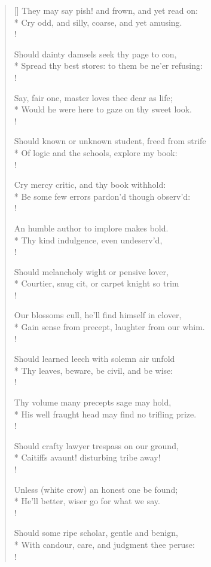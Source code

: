\begin{verse}[\versewidth]
They may say pish! and frown, and yet read on:\\*
Cry odd, and silly, coarse, and yet amusing.\\!

Should dainty damsels seek thy page to con,\\*
Spread thy best stores: to them be ne'er refusing:\\!

Say, fair one, master loves thee dear as life;\\*
Would he were here to gaze on thy sweet look.\\!

Should known or unknown student, freed from strife\\*
Of logic and the schools, explore my book:\\!

Cry mercy critic, and thy book withhold:\\*
Be some few errors pardon'd though observ'd:\\!

An humble author to implore makes bold.\\*
Thy kind indulgence, even undeserv'd,\\!

Should melancholy wight or pensive lover,\\*
Courtier, snug cit, or carpet knight so trim\\!

Our blossoms cull, he'll find himself in clover,\\*
Gain sense from precept, laughter from our whim.\\!

Should learned leech with solemn air unfold\\*
Thy leaves, beware, be civil, and be wise:\\!

Thy volume many precepts sage may hold,\\*
His well fraught head may find no trifling prize.\\!

Should crafty lawyer trespass on our ground,\\*
Caitiffs avaunt! disturbing tribe away!\\!

Unless (white crow) an honest one be found;\\*
He'll better, wiser go for what we say.\\!

Should some ripe scholar, gentle and benign,\\*
With candour, care, and judgment thee peruse:\\!


\end{verse}
